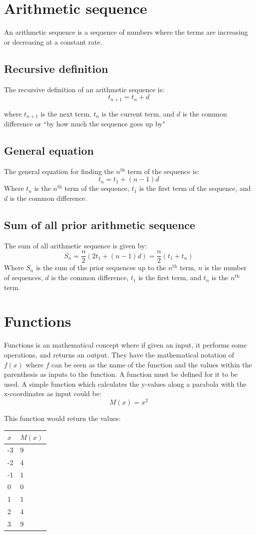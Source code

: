 \documentclass{book}
\begin{document}
\chapter{Arithmetic sequence}

An arithmetic sequence is a sequence of numbers where the terms are increasing or decreasing at a constant rate.

\section{Recursive definition}
The recursive definition of an arithmetic sequence is:
\[
	t_{n + 1} = t_n + d
\]

where $t_{n + 1}$ is the next term, $t_n$ is the current term, and $d$ is the common difference or ``by how much the sequence goes up by"

\section{General equation}
The general equation for finding the $n^{\text{th}}$ term of the sequence is:
\[
	t_n = t_1 + (n - 1)d
\]
Where $t_n$ is the $n^{\text{th}}$ term of the sequence, $t_1$ is the first term of the sequence, and $d$ is the common difference.

\section{Sum of all prior arithmetic sequence}
The sum of all arithmetic sequence is given by:
\[
	S_n = \frac{n}{2}(2t_1 + (n - 1)d) = \frac{n}{2}(t_1 + t_n)
\]
Where $S_n$ is the sum of the prior sequences up to the $n^{\text{th}}$ term, $n$ is the number of sequences, $d$ is the common difference, $t_1$ is the first term, and $t_n$ is the $n^{\text{th}}$ term.

\chapter{Functions}
Functions is an mathematical concept where if given an input, it performs some operations, and returns an output.  They have the mathematical notation of $f(x)$ where $f$ can be seen as the name of the function and the values within the parenthesis as inputs to the function.  A function must be defined for it to be used.  A simple function which calculates the y-values along a parabola with the x-coordinates as input could be:
\[
	M(x) = x^2
\]

This function would return the values:
\begin{center}
	\begin{tabular}{l|l}
		$x$ & $M(x)$ \\ \hline
		-3  & 9      \\
		-2  & 4      \\
		-1  & 1      \\
		0   & 0      \\
		1   & 1      \\
		2   & 4      \\
		3   & 9
	\end{tabular}
\end{center}
\end{document}
